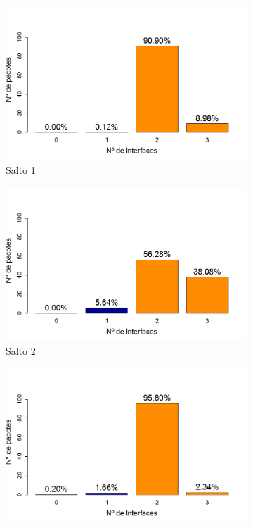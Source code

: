 \documentclass[
	12pt,				%
	openright,			%
	oneside,
	a4paper,			%
	english,			%
	french,				%
	spanish,			%
	brazil				%
	]{abntex2}
\begin{document}
\begin{figure}[tb]
	\centering
	\caption{Ditribuição da recepção dos pacotes (Sem otimização)}
	\label{fig_dpr_no_opt}
	\begin{subfigure}{.5\textwidth}
		\centering
		\includegraphics[width=.98\linewidth]{DRP_Salto1}
		\captionsetup{width=.9\textwidth}
		\caption{Salto 1}
		\label{dpr_no_opt_s1}
	\end{subfigure}%
	\begin{subfigure}{.5\textwidth}
		\centering
		\includegraphics[width=.98\linewidth]{DRP_Salto2}
		\captionsetup{width=.9\textwidth}
		\caption{Salto 2}
		\label{dpr_no_opt_s2}
	\end{subfigure}
	\begin{subfigure}{.5\textwidth}
		\centering
		\includegraphics[width=.98\linewidth]{DRP_Salto3}

\end{subfigure}
\end{figure}
\end{document}
